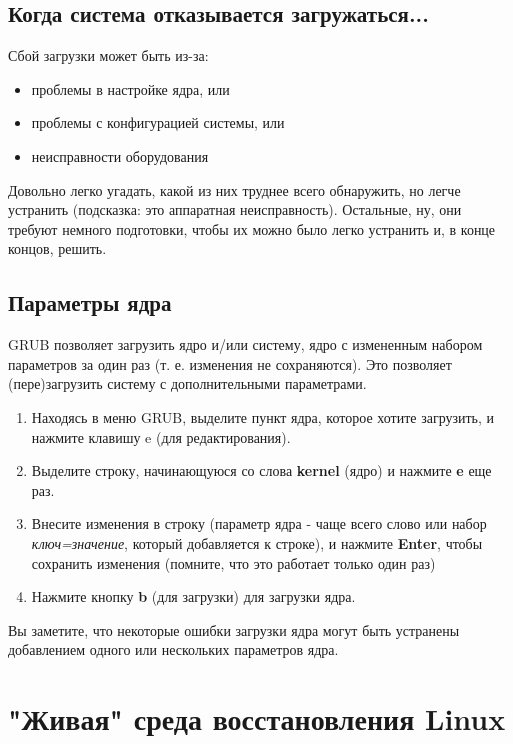 \documentclass[10pt]{book}
\begin{document}
\subsection{Когда система отказывается загружаться...}

Сбой загрузки может быть из-за:

\begin{itemize}
\item проблемы в настройке ядра, или
\item проблемы с конфигурацией системы, или
\item неисправности оборудования
\end{itemize}

Довольно легко угадать, какой из них труднее всего обнаружить, но легче устранить (подсказка: это аппаратная неисправность). Остальные, ну, они требуют немного подготовки, чтобы их можно было легко устранить и, в конце концов, решить.

\subsection{Параметры ядра}

GRUB позволяет загрузить ядро и/или систему, ядро с измененным набором параметров за один раз (т. е. изменения не сохраняются). Это позволяет (пере)загрузить систему с дополнительными параметрами.

\begin{enumerate}
\item Находясь в меню GRUB, выделите пункт ядра, которое хотите загрузить, и нажмите клавишу \textbf{}e (для редактирования).
\item Выделите строку, начинающуюся со слова \textbf{kernel} (ядро) и нажмите \textbf{e}  еще раз.
\item Внесите изменения в строку (параметр ядра - чаще всего слово или набор \textit{ключ=значение}, который добавляется к строке),
и нажмите \textbf{Enter}, чтобы сохранить изменения (помните, что это работает только один раз)
\item Нажмите кнопку \textbf{b} (для загрузки) для загрузки ядра.
\end{enumerate}

Вы заметите, что некоторые ошибки загрузки ядра могут быть устранены добавлением одного или нескольких параметров ядра.

\section{"Живая" среда восстановления Linux}
\end{document}
